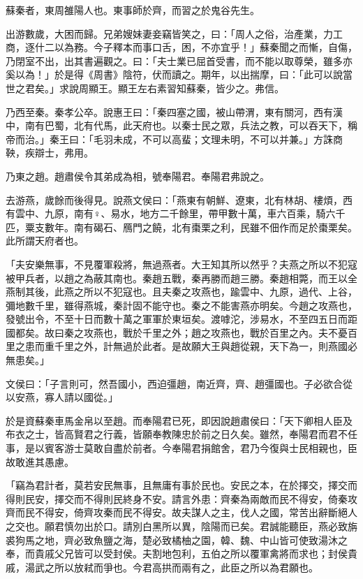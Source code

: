 
\begin{pinyinscope}
蘇秦者，東周雒陽人也。東事師於齊，而習之於鬼谷先生。

出游數歲，大困而歸。兄弟嫂妹妻妾竊皆笑之，曰：「周人之俗，治產業，力工商，逐什二以為務。今子釋本而事口舌，困，不亦宜乎！」蘇秦聞之而慚，自傷，乃閉室不出，出其書遍觀之。曰：「夫士業已屈首受書，而不能以取尊榮，雖多亦奚以為！」於是得《周書》陰符，伏而讀之。期年，以出揣摩，曰：「此可以說當世之君矣。」求說周顯王。顯王左右素習知蘇秦，皆少之。弗信。

乃西至秦。秦孝公卒。說惠王曰：「秦四塞之國，被山帶渭，東有關河，西有漢中，南有巴蜀，北有代馬，此天府也。以秦士民之眾，兵法之教，可以吞天下，稱帝而治。」秦王曰：「毛羽未成，不可以高蜚；文理未明，不可以并兼。」方誅商鞅，疾辯士，弗用。

乃東之趙。趙肅侯令其弟成為相，號奉陽君。奉陽君弗說之。

去游燕，歲餘而後得見。說燕文侯曰：「燕東有朝鮮、遼東，北有林胡、樓煩，西有雲中、九原，南有♀、易水，地方二千餘里，帶甲數十萬，車六百乘，騎六千匹，粟支數年。南有碣石、鴈門之饒，北有棗栗之利，民雖不佃作而足於棗栗矣。此所謂天府者也。

「夫安樂無事，不見覆軍殺將，無過燕者。大王知其所以然乎？夫燕之所以不犯寇被甲兵者，以趙之為蔽其南也。秦趙五戰，秦再勝而趙三勝。秦趙相斃，而王以全燕制其後，此燕之所以不犯寇也。且夫秦之攻燕也，踰雲中、九原，過代、上谷，彌地數千里，雖得燕城，秦計固不能守也。秦之不能害燕亦明矣。今趙之攻燕也，發號出令，不至十日而數十萬之軍軍於東垣矣。渡嘑沱，涉易水，不至四五日而距國都矣。故曰秦之攻燕也，戰於千里之外；趙之攻燕也，戰於百里之內。夫不憂百里之患而重千里之外，計無過於此者。是故願大王與趙從親，天下為一，則燕國必無患矣。」

文侯曰：「子言則可，然吾國小，西迫彊趙，南近齊，齊、趙彊國也。子必欲合從以安燕，寡人請以國從。」

於是資蘇秦車馬金帛以至趙。而奉陽君已死，即因說趙肅侯曰：「天下卿相人臣及布衣之士，皆高賢君之行義，皆願奉教陳忠於前之日久矣。雖然，奉陽君而君不任事，是以賓客游士莫敢自盡於前者。今奉陽君捐館舍，君乃今復與士民相親也，臣故敢進其愚慮。

「竊為君計者，莫若安民無事，且無庸有事於民也。安民之本，在於擇交，擇交而得則民安，擇交而不得則民終身不安。請言外患：齊秦為兩敵而民不得安，倚秦攻齊而民不得安，倚齊攻秦而民不得安。故夫謀人之主，伐人之國，常苦出辭斷絕人之交也。願君慎勿出於口。請別白黑所以異，陰陽而已矣。君誠能聽臣，燕必致旃裘狗馬之地，齊必致魚鹽之海，楚必致橘柚之園，韓、魏、中山皆可使致湯沐之奉，而貴戚父兄皆可以受封侯。夫割地包利，五伯之所以覆軍禽將而求也；封侯貴戚，湯武之所以放弒而爭也。今君高拱而兩有之，此臣之所以為君願也。


\end{pinyinscope}
